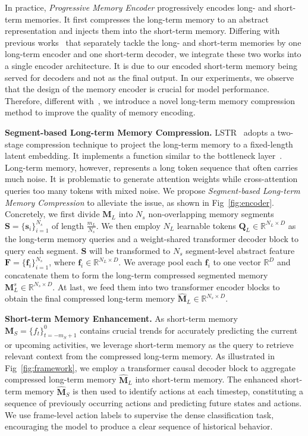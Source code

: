 In practice, \emph{Progressive Memory Encoder} progressively encodes long- and short-term memories. It first compresses the long-term memory to an abstract representation and injects them into the short-term memory. 
Differing with previous works~\cite{lstr, testra} that separately tackle the long- and short-term memories by one long-term encoder and one short-term decoder, we integrate these two works into a single encoder architecture.
It is due to our encoded short-term memory being served for decoders and not as the final output. In our experiments, we observe that the design of the memory encoder is crucial for model performance. Therefore, different with~\cite{lstr, testra}, we introduce a novel long-term memory compression method to improve the quality of memory encoding.

\textbf{Segment-based Long-term Memory Compression.}
LSTR~\cite{lstr} adopts a two-stage compression technique to project the long-term memory to a fixed-length latent embedding. It implements a function similar to the bottleneck layer~\cite{resnet}. 
Long-term memory, however, represents a long token sequence that often carries much noise.
It is problematic to generate attention weights while cross-attention queries too many tokens with mixed noise. 
We propose \emph{Segment-based Long-term Memory Compression} to alleviate the issue, as shown in Fig~\ref{fig:encoder}.
Concretely, we first divide $\mathbf{M}_{L}$ into $N_s$ non-overlapping memory segments  
$ \mathbf{S} = \{ \mathbf{s}_{i}\}^{N_s}_{i=1} $ of length $\frac{m_L}{N_s}$.
We then employ $N_L$ learnable tokens $ \mathbf{Q}_{L} \in \mathbb{R}^{ N_L \times D }$ as the long-term memory queries and a weight-shared transformer decoder block to query each segment. 
$\mathbf{S}$ will be transformed to $N_s$ segment-level abstract feature $\mathbf{F} =\{ \mathbf{f}_{i}\}^{N_s}_{i=1}$, where $\mathbf{f}_{i} \in \mathbb{R}^{ N_L \times D }$. We average pool each $\mathbf{f}_{i}$ to one vector $\mathbb{R}^{ D }$ and concatenate them to form the long-term compressed segmented memory $\mathbf{M}_L^s \in \mathbb{R}^{ N_s \times D }$.
At last, we feed them into two transformer encoder blocks to obtain the final compressed long-term memory $ \mathbf{\widehat{M}}_L \in \mathbb{R}^{N_s \times D} $.  
 


\textbf{Short-term Memory Enhancement.}
As short-term memory $ \mathbf{M}_S = \{ f_t \}_{t = -m_S + 1}^{0} $ contains crucial trends for accurately predicting the current or upcoming activities, we leverage short-term memory as the query to retrieve relevant context from the compressed long-term memory.
As illustrated in Fig~\ref{fig:framework}, we employ a transformer causal decoder block to aggregate compressed long-term memory $\mathbf{\widehat{M}}_L$ into short-term memory. The enhanced short-term memory $\mathbf{\widehat{M}}_S$ is then used to identify actions at each timestep, constituting a sequence of previously occurring actions and predicting future states and actions. We use frame-level action labels to supervise the dense classification task, encouraging the model to produce a clear sequence of historical behavior.



